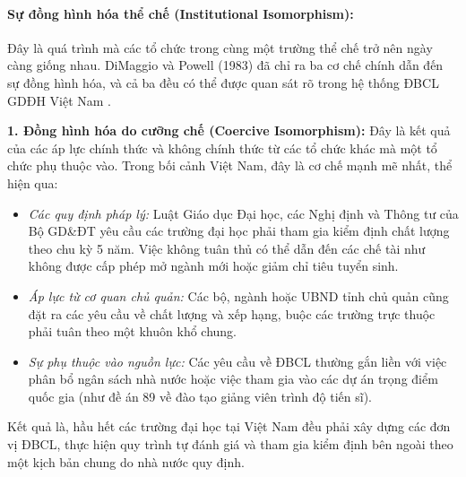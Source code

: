 \documentclass[12pt, a4paper, openany]{report}
\begin{document}
\paragraph{Sự đồng hình hóa thể chế (Institutional Isomorphism):}
Đây là quá trình mà các tổ chức trong cùng một trường thể chế trở nên ngày càng giống nhau. DiMaggio và Powell (1983) đã chỉ ra ba cơ chế chính dẫn đến sự đồng hình hóa, và cả ba đều có thể được quan sát rõ trong hệ thống ĐBCL GDĐH Việt Nam \cite{DiMaggioPowell1983}.

\textbf{1. Đồng hình hóa do cưỡng chế (Coercive Isomorphism):} Đây là kết quả của các áp lực chính thức và không chính thức từ các tổ chức khác mà một tổ chức phụ thuộc vào. Trong bối cảnh Việt Nam, đây là cơ chế mạnh mẽ nhất, thể hiện qua:
\begin{itemize}
    \item \textit{Các quy định pháp lý:} Luật Giáo dục Đại học, các Nghị định và Thông tư của Bộ GD\&ĐT yêu cầu các trường đại học phải tham gia kiểm định chất lượng theo chu kỳ 5 năm. Việc không tuân thủ có thể dẫn đến các chế tài như không được cấp phép mở ngành mới hoặc giảm chỉ tiêu tuyển sinh.
    \item \textit{Áp lực từ cơ quan chủ quản:} Các bộ, ngành hoặc UBND tỉnh chủ quản cũng đặt ra các yêu cầu về chất lượng và xếp hạng, buộc các trường trực thuộc phải tuân theo một khuôn khổ chung.
    \item \textit{Sự phụ thuộc vào nguồn lực:} Các yêu cầu về ĐBCL thường gắn liền với việc phân bổ ngân sách nhà nước hoặc việc tham gia vào các dự án trọng điểm quốc gia (như đề án 89 về đào tạo giảng viên trình độ tiến sĩ).
\end{itemize}
Kết quả là, hầu hết các trường đại học tại Việt Nam đều phải xây dựng các đơn vị ĐBCL, thực hiện quy trình tự đánh giá và tham gia kiểm định bên ngoài theo một kịch bản chung do nhà nước quy định.

\end{document}
